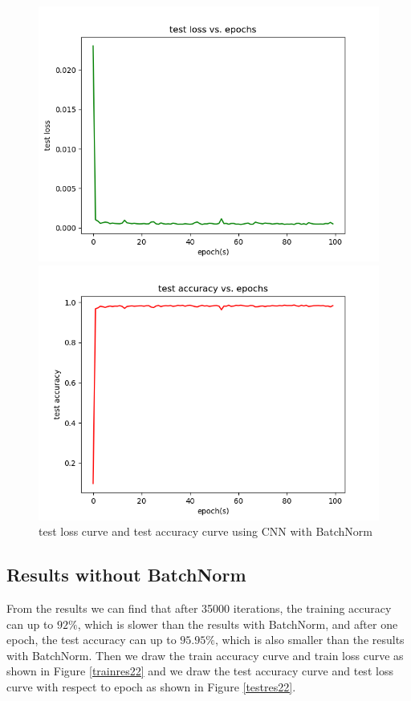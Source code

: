 \documentclass{elegantbook}
\begin{document}
\begin{figure}[!h]
	\centering
	\begin{minipage}[t]{0.48\textwidth}
		\centering
		\includegraphics[width=\textwidth]{../results/testloss21}
	\end{minipage}
	\begin{minipage}[t]{0.48\textwidth}
		\centering
		\includegraphics[width=\textwidth]{../results/testacc21}
	\end{minipage}
	\caption{\label{testres21}test loss curve and test accuracy curve using CNN with BatchNorm}
\end{figure}

\subsection{Results without BatchNorm}
From the results we can find that after 35000 iterations, the training accuracy can up to $92\%$, which is slower than the results with BatchNorm, and after one epoch, the test accuracy can up to $95.95\%$, which is also smaller than the results with BatchNorm. Then we draw the train accuracy curve and train loss curve as shown in Figure \ref{trainres22} and we draw the test accuracy curve and test loss curve with respect to epoch as shown in Figure \ref{testres22}.
\end{document}
